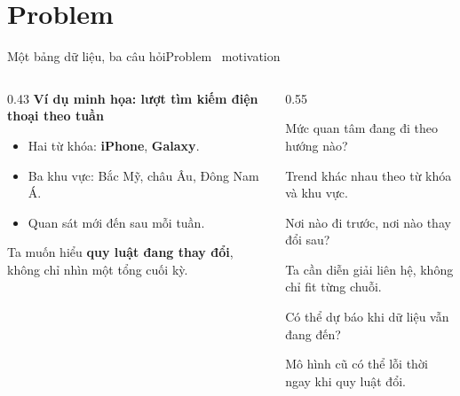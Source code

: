 \documentclass[aspectratio=169,11pt]{beamer}
\begin{document}
\section{Problem}

\begin{frame}[shrink=11]{Một bảng dữ liệu, ba câu hỏi}{Problem \textperiodcentered\ motivation}
\begin{columns}[T,onlytextwidth]
\begin{column}{0.43\textwidth}
  {\large\bfseries\color{DTNavy}Ví dụ minh họa: lượt tìm kiếm điện thoại theo tuần}
  \vspace{3mm}
  \begin{itemize}
    \item Hai từ khóa: \textbf{iPhone}, \textbf{Galaxy}.
    \item Ba khu vực: Bắc Mỹ, châu Âu, Đông Nam Á.
    \item Quan sát mới đến sau mỗi tuần.
  \end{itemize}
  \vspace{2mm}
  \begin{intuition}
    Ta muốn hiểu \textbf{quy luật đang thay đổi}, không chỉ nhìn một tổng cuối kỳ.
  \end{intuition}
\end{column}
\begin{column}{0.55\textwidth}
  \begin{questioncard}
    \par
    {\large Mức quan tâm đang đi theo hướng nào?}\par
    {\small\color{DTMuted}Trend khác nhau theo từ khóa và khu vực.}
  \end{questioncard}
  \vspace{2mm}
  \begin{questioncard}
    \par
    {\large Nơi nào đi trước, nơi nào thay đổi sau?}\par
    {\small\color{DTMuted}Ta cần diễn giải liên hệ, không chỉ fit từng chuỗi.}
  \end{questioncard}
  \vspace{2mm}
  \begin{questioncard}
    \par
    {\large Có thể dự báo khi dữ liệu vẫn đang đến?}\par
    {\small\color{DTMuted}Mô hình cũ có thể lỗi thời ngay khi quy luật đổi.}
  \end{questioncard}
\end{column}
\end{columns}
\vspace{2mm}
\end{frame}
\end{document}
